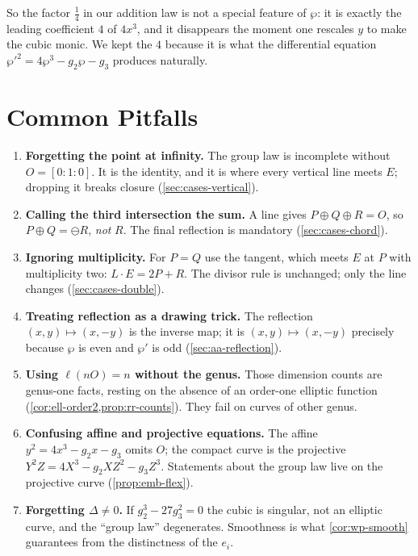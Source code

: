 So the factor \(\tfrac14\) in our addition law is not a special feature of \(\wp\):
it is exactly the leading coefficient \(4\) of \(4x^3\), and it disappears the
moment one rescales \(y\) to make the cubic monic. We kept the \(4\) because it is
what the differential equation \(\wp'^2 = 4\wp^3 - g_2\wp - g_3\) produces
naturally.

\section{Common Pitfalls}
\label{sec:wk-pitfalls}

\begin{enumerate}
\item \textbf{Forgetting the point at infinity.} The group law is incomplete
without \(O = [0:1:0]\). It is the identity, and it is where every vertical line
meets \(E\); dropping it breaks closure (\cref{sec:cases-vertical}).

\item \textbf{Calling the third intersection the sum.} A line gives
\(P \oplus Q \oplus R = O\), so \(P \oplus Q = \ominus R\), \emph{not} \(R\). The
final reflection is mandatory (\cref{sec:cases-chord}).

\item \textbf{Ignoring multiplicity.} For \(P = Q\) use the tangent, which meets
\(E\) at \(P\) with multiplicity two: \(L \cdot E = 2P + R\). The divisor rule is
unchanged; only the line changes (\cref{sec:cases-double}).

\item \textbf{Treating reflection as a drawing trick.} The reflection
\((x,y) \mapsto (x,-y)\) is the inverse map; it is \((x,y)\mapsto(x,-y)\) precisely
because \(\wp\) is even and \(\wp'\) is odd (\cref{sec:aa-reflection}).

\item \textbf{Using \(\ell(nO) = n\) without the genus.} Those dimension counts
are genus-one facts, resting on the absence of an order-one elliptic function
(\cref{cor:ell-order2,prop:rr-counts}). They fail on curves of other genus.

\item \textbf{Confusing affine and projective equations.} The affine
\(y^2 = 4x^3 - g_2 x - g_3\) omits \(O\); the compact curve is the projective
\(Y^2 Z = 4X^3 - g_2 X Z^2 - g_3 Z^3\). Statements about the group law live on the
projective curve (\cref{prop:emb-flex}).

\item \textbf{Forgetting \(\Delta \ne 0\).} If \(g_2^3 - 27 g_3^2 = 0\) the cubic
is singular, not an elliptic curve, and the ``group law'' degenerates. Smoothness
is what \cref{cor:wp-smooth} guarantees from the distinctness of the \(e_i\).
\end{enumerate}

